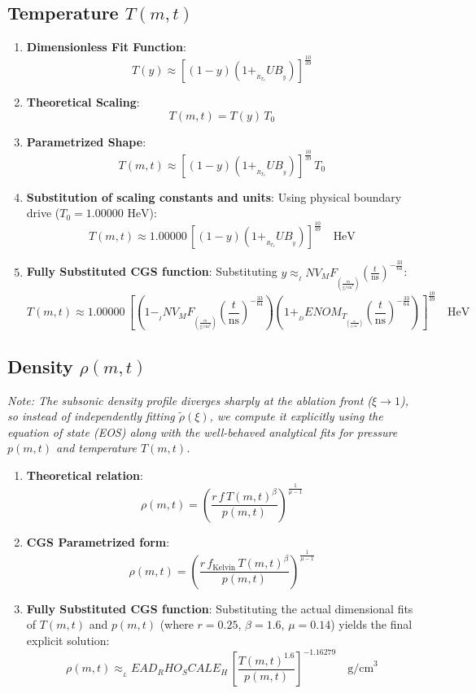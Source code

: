 \documentclass[11pt]{article}
\begin{document}
\subsection{Temperature $T(m,t)$}
\begin{enumerate}
    \item \textbf{Dimensionless Fit Function}:
    $$T(y) \approx \left[ (1 - y)(1 + __R_T_SUB__ y) \right]^{\frac{10}{39}}$$
    \item \textbf{Theoretical Scaling}:
    $$T(m,t) = T(y) \, T_0$$
    \item \textbf{Parametrized Shape}:
    $$T(m,t) \approx \left[ (1 - y)(1 + __R_T_SUB__ y) \right]^{\frac{10}{39}} \, T_0$$
    \item \textbf{Substitution of scaling constants and units}:
    Using physical boundary drive ($T_0 = 1.00000 \text{ HeV}$):
    $$T(m,t) \approx 1.00000 \, \left[ (1 - y)(1 + __R_T_SUB__ y) \right]^{\frac{10}{39}} \quad \text{HeV}$$
    \item \textbf{Fully Substituted CGS function}:
    Substituting $y \approx __INV_MF__ \left(\frac{m}{\text{g/cm}^2}\right) \left(\frac{t}{\text{ns}}\right)^{-\frac{33}{64}}$:
    $$T(m,t) \approx 1.00000 \, \left[ \left(1 - __INV_MF__ \left(\frac{m}{\text{g/cm}^2}\right) \left(\frac{t}{\text{ns}}\right)^{-\frac{33}{64}}\right)\left(1 + __DENOM_T__ \left(\frac{m}{\text{g/cm}^2}\right) \left(\frac{t}{\text{ns}}\right)^{-\frac{33}{64}}\right) \right]^{\frac{10}{39}} \quad \text{HeV}$$
\end{enumerate}

\subsection{Density $\rho(m,t)$}
\textit{Note: The subsonic density profile diverges sharply at the ablation front ($\xi \to 1$), so instead of independently fitting $\tilde{\rho}(\xi)$, we compute it explicitly using the equation of state (EOS) along with the well-behaved analytical fits for pressure $p(m,t)$ and temperature $T(m,t)$.}
\begin{enumerate}
    \item \textbf{Theoretical relation}:
    $$\rho(m,t) = \left( \frac{r \, f \, T(m,t)^\beta}{p(m,t)} \right)^{\frac{1}{\mu-1}}$$
    \item \textbf{CGS Parametrized form}:
    $$\rho(m,t) = \left( \frac{r \, f_{\text{Kelvin}} \, T(m,t)^\beta}{p(m,t)} \right)^{\frac{1}{\mu-1}}$$
    \item \textbf{Fully Substituted CGS function}:
    Substituting the actual dimensional fits of $T(m,t)$ and $p(m,t)$ (where $r=0.25$, $\beta=1.6$, $\mu=0.14$) yields the final explicit solution:
    $$\rho(m,t) \approx __LEAD_RHO_SCALE_H__ \cdot \left[ \frac{T(m,t)^{1.6}}{p(m,t)} \right]^{-1.16279} \quad \text{g/cm}^3$$
\end{enumerate}
\end{document}
